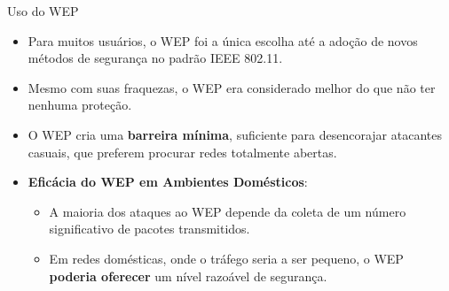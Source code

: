 \begin{frame}{Uso do WEP}
\begin{itemize}
    \item Para muitos usuários, o WEP foi a única escolha até a adoção de novos métodos de segurança no padrão IEEE 802.11.
    \item Mesmo com suas fraquezas, o WEP era considerado melhor do que não ter nenhuma proteção.
    \item O WEP cria uma \textbf{barreira mínima}, suficiente para desencorajar atacantes casuais, que preferem procurar redes totalmente abertas.
\end{itemize}

\begin{itemize}
\item \textbf{Eficácia do WEP em Ambientes Domésticos}:
\begin{itemize}
    \item A maioria dos ataques ao WEP depende da coleta de um número significativo de pacotes transmitidos.
    \item Em redes domésticas, onde o tráfego seria a ser pequeno, o WEP \textbf{poderia oferecer} um nível razoável de segurança.

\end{itemize}

\end{itemize}


\end{frame}



